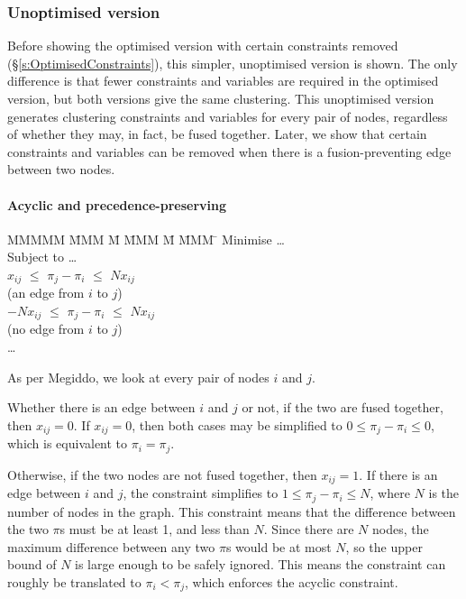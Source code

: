 \subsubsection{Unoptimised version}
Before showing the optimised version with certain constraints removed (\S\ref{s:OptimisedConstraints}), this simpler, unoptimised version is shown.
The only difference is that fewer constraints and variables are required in the optimised version, but both versions give the same clustering.
This unoptimised version generates clustering constraints and variables for every pair of nodes, regardless of whether they may, in fact, be fused together.
Later, we show that certain constraints and variables can be removed when there is a fusion-preventing edge between two nodes.


\paragraph{Acyclic and precedence-preserving}

\begin{tabbing}
MMMMM   \= MMM \= M \= MMM \= M \= MMM \= \kill
Minimise   \> \ldots \\
Subject to \> \ldots \\
           \>    $x_{ij}$ \> $\le$ \> $\pi_j - \pi_i$ \> $\le$ \> $N x_{ij}$ \\
           \>             (an edge from $i$ to $j$)            \\
           \> $-N x_{ij}$ \> $\le$ \> $\pi_j - \pi_i$ \> $\le$ \> $N x_{ij}$ \\
           \>             (no edge from $i$ to $j$)            \\
           \> \ldots
\end{tabbing}
As per Megiddo\cite{megiddo1998optimal}, we look at every pair of nodes $i$ and $j$.

Whether there is an edge between $i$ and $j$ or not, if the two are fused together, then $x_{ij} = 0$. If $x_{ij} = 0$, then both cases may be simplified to $0 \le \pi_j - \pi_i \le 0$, which is equivalent to $\pi_i = \pi_j$. 

Otherwise, if the two nodes are not fused together, then $x_{ij} = 1$. If there is an edge between $i$ and $j$, the constraint simplifies to $1 \le \pi_j - \pi_i \le N$, where $N$ is the number of nodes in the graph. This constraint means that the difference between the two $\pi$s must be at least 1, and less than $N$. Since there are $N$ nodes, the maximum difference between any two $\pi$s would be at most $N$, so the upper bound of $N$ is large enough to be safely ignored. This means the constraint can roughly be translated to $\pi_i < \pi_j$, which enforces the acyclic constraint.

